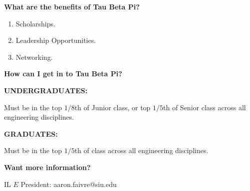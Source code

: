 \documentclass[12pt]{extarticle}
\begin{document}
\bigskip
{\large \textbf{What are the benefits of Tau Beta Pi?}}

\begin{enumerate}
    \item Scholarships.
    \item Leadership Opportunities.
    \item Networking.
\end{enumerate}

\bigskip
{\large \textbf{How can I get in to Tau Beta Pi?}}

\bigskip
{\normalsize \textbf{UNDERGRADUATES:}}

Must be in the top \( 1/8 \)th of Junior class, or top \( 1/5 \)th of Senior class across all engineering disciplines.

\bigskip
{\normalsize \textbf{GRADUATES:}}

Must be in the top \( 1/5 \)th of class across all engineering disciplines.

\bigskip
{\large \textbf{Want more information?}}

\smallskip
IL \( E \) President: aaron.faivre@siu.edu
\end{document}
